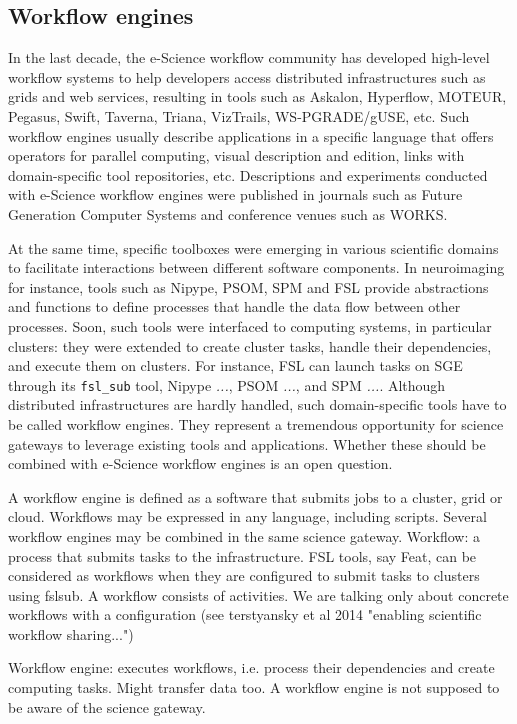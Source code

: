 \documentclass[preprint,3p,twocolumn]{elsarticle}
\newcommand{\todo}[1]{\color{blue}\xspace\emph{#1}\xspace\color{black}}
\begin{document}
\subsection{Workflow engines}

In the last decade, the e-Science workflow community has developed
high-level workflow systems to help developers access distributed
infrastructures such as grids and web services, resulting in tools
such as Askalon, Hyperflow, MOTEUR, Pegasus, Swift, Taverna, Triana,
VizTrails, WS-PGRADE/gUSE, etc. Such workflow engines usually describe
applications in a specific language that offers operators for parallel
computing, visual description and edition, links with domain-specific
tool repositories, etc. Descriptions and experiments conducted with
e-Science workflow engines were published in journals such as Future
Generation Computer Systems and conference venues such as
WORKS. 

At the same time, specific toolboxes were emerging in various
scientific domains to facilitate interactions between different
software components. In neuroimaging for instance, tools such as
Nipype, PSOM, SPM and FSL provide abstractions and functions to define
processes that handle the data flow between other processes. Soon,
such tools were interfaced to computing systems, in particular
clusters: they were extended to create cluster tasks, handle their
dependencies, and execute them on clusters. For instance, FSL can
launch tasks on SGE through its \texttt{fsl\_sub} tool, Nipype
\todo{...}, PSOM \todo{...}, and SPM \todo{...}. Although distributed
infrastructures are hardly handled, such domain-specific tools have to
be called workflow engines. They represent a tremendous opportunity
for science gateways to leverage existing tools and
applications. Whether these should be combined with e-Science workflow
engines is an open question.

A workflow engine is defined as a software that submits jobs to a
cluster, grid or cloud. Workflows may be expressed in any language,
including scripts. Several workflow engines may be combined in the
same science gateway. Workflow: a process that submits tasks to the
infrastructure. FSL tools, say Feat, can be considered as workflows
when they are configured to submit tasks to clusters using fslsub. A
workflow consists of activities. We are talking only about concrete
workflows with a configuration (see terstyansky et al 2014 "enabling
scientific workflow sharing...")

  Workflow engine: executes workflows, i.e. process their dependencies
  and create computing tasks. Might transfer data too. A workflow
  engine is not supposed to be aware of the science gateway.
\end{document}
